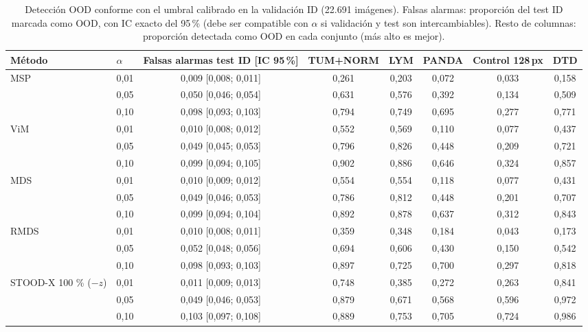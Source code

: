 \begin{table}[tbp]
\centering
\scriptsize
\setlength{\tabcolsep}{3pt}
\caption{Detección OOD conforme con el umbral calibrado en la validación ID (22.691 imágenes). Falsas alarmas: proporción del test ID marcada como OOD, con IC exacto del 95\,\% (debe ser compatible con $\alpha$ si validación y test son intercambiables). Resto de columnas: proporción detectada como OOD en cada conjunto (más alto es mejor).}
\label{tab:conforme-ood}
\begin{tabular}{llcccccc}
\toprule
Método & $\alpha$ & Falsas alarmas test ID [IC 95\,\%] & TUM+NORM & LYM & PANDA & Control 128\,px & DTD \\
\midrule
MSP & 0{,}01 & 0{,}009 [0{,}008; 0{,}011] & 0{,}261 & 0{,}203 & 0{,}072 & 0{,}033 & 0{,}158 \\
 & 0{,}05 & 0{,}050 [0{,}046; 0{,}054] & 0{,}631 & 0{,}576 & 0{,}392 & 0{,}134 & 0{,}509 \\
 & 0{,}10 & 0{,}098 [0{,}093; 0{,}103] & 0{,}794 & 0{,}749 & 0{,}695 & 0{,}277 & 0{,}771 \\
\midrule
ViM & 0{,}01 & 0{,}010 [0{,}008; 0{,}012] & 0{,}552 & 0{,}569 & 0{,}110 & 0{,}077 & 0{,}437 \\
 & 0{,}05 & 0{,}049 [0{,}045; 0{,}053] & 0{,}796 & 0{,}826 & 0{,}448 & 0{,}209 & 0{,}721 \\
 & 0{,}10 & 0{,}099 [0{,}094; 0{,}105] & 0{,}902 & 0{,}886 & 0{,}646 & 0{,}324 & 0{,}857 \\
\midrule
MDS & 0{,}01 & 0{,}010 [0{,}009; 0{,}012] & 0{,}554 & 0{,}554 & 0{,}118 & 0{,}077 & 0{,}431 \\
 & 0{,}05 & 0{,}049 [0{,}046; 0{,}053] & 0{,}786 & 0{,}812 & 0{,}448 & 0{,}201 & 0{,}707 \\
 & 0{,}10 & 0{,}099 [0{,}094; 0{,}104] & 0{,}892 & 0{,}878 & 0{,}637 & 0{,}312 & 0{,}843 \\
\midrule
RMDS & 0{,}01 & 0{,}010 [0{,}008; 0{,}011] & 0{,}359 & 0{,}348 & 0{,}184 & 0{,}043 & 0{,}173 \\
 & 0{,}05 & 0{,}052 [0{,}048; 0{,}056] & 0{,}694 & 0{,}606 & 0{,}430 & 0{,}150 & 0{,}542 \\
 & 0{,}10 & 0{,}098 [0{,}093; 0{,}103] & 0{,}897 & 0{,}725 & 0{,}700 & 0{,}297 & 0{,}818 \\
\midrule
STOOD-X 100 \% ($-z$) & 0{,}01 & 0{,}011 [0{,}009; 0{,}013] & 0{,}748 & 0{,}385 & 0{,}272 & 0{,}263 & 0{,}841 \\
 & 0{,}05 & 0{,}049 [0{,}046; 0{,}053] & 0{,}879 & 0{,}671 & 0{,}568 & 0{,}596 & 0{,}972 \\
 & 0{,}10 & 0{,}103 [0{,}097; 0{,}108] & 0{,}889 & 0{,}753 & 0{,}705 & 0{,}724 & 0{,}986 \\
\bottomrule
\end{tabular}
\end{table}

